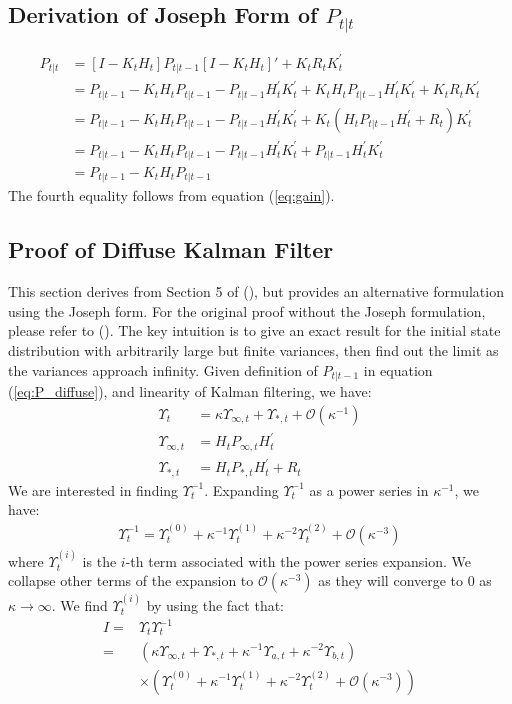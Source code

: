 \documentclass[10pt, titlepage]{article}
\numberwithin{equation}{section}
\begin{document}
\subsection{Derivation of Joseph Form of \texorpdfstring{$P_{t|t}$}{}} \label{ap:joseph}
\begin{align*}
    P_{t|t} &= [I - K_tH_t]P_{t|t-1}[I - K_tH_t]' + K_tR_tK_t^{'} \\
    &= P_{t|t-1} - K_tH_tP_{t|t-1} - P_{t|t-1}H_t^{'}K_t^{'} + K_tH_tP_{t|t-1}H_t^{'}K_t^{'} + K_tR_tK_t^{'} \\
    &= P_{t|t-1} - K_tH_tP_{t|t-1} - P_{t|t-1}H_t^{'}K_t^{'} + K_t(H_tP_{t|t-1}H_t^{'} + R_t)K_t^{'} \\
    &= P_{t|t-1} - K_tH_tP_{t|t-1} - P_{t|t-1}H_t^{'}K_t^{'} + P_{t|t-1}H_t^{'}K_t^{'} \\
    &= P_{t|t-1} - K_tH_tP_{t|t-1}
\end{align*}
The fourth equality follows from equation (\ref{eq:gain}).

\subsection{Proof of Diffuse Kalman Filter} \label{ap:init_filter}
This section derives from Section 5 of (\cite{durbin_koopman_2001}), but provides an alternative formulation using the Joseph form. For the original proof without the Joseph formulation, please refer to (\cite{durbin_koopman_2001}). The key intuition is to give an exact result for the initial state distribution with arbitrarily large but finite variances, then find out the limit as the variances approach infinity. Given definition of $P_{t|t-1}$ in equation (\ref{eq:P_diffuse}), and linearity of Kalman filtering, we have:
\begin{align*}
    \Upsilon_t &= \kappa \Upsilon_{\infty,t} + \Upsilon_{*,t} + \mathcal{O}(\kappa^{-1}) \\
    \Upsilon_{\infty,t} &= H_tP_{\infty,t}H_t^{'} \\ 
    \Upsilon_{*,t} &= H_tP_{*,t}H_t^{'} + R_t
\end{align*}
We are interested in finding $\Upsilon_t^{-1}$. Expanding $\Upsilon_t^{-1}$ as a power series in $\kappa^{-1}$, we have:
\begin{align*}
    \Upsilon_t^{-1} = \Upsilon_t^{(0)} + \kappa^{-1}\Upsilon_t^{(1)} + \kappa^{-2}\Upsilon_t^{(2)}+\mathcal{O}(\kappa^{-3})
\end{align*}
where $\Upsilon_t^{(i)}$ is the $i$-th term associated with the power series expansion. We collapse other terms of the expansion to $\mathcal{O}(\kappa^{-3})$ as they will converge to 0 as $\kappa \rightarrow \infty$. We find $\Upsilon_t^{(i)}$ by using the fact that: 
\begin{align}
    I =& \Upsilon_t\Upsilon_t^{-1} \nonumber \\
    =& (\kappa \Upsilon_{\infty,t} + \Upsilon_{*,t} + \kappa^{-1}\Upsilon_{a,t} + \kappa^{-2}\Upsilon_{b,t}) \label{eq:inverse_diff}
 \\
    &\times (\Upsilon_t^{(0)} + \kappa^{-1}\Upsilon_t^{(1)} + \kappa^{-2}\Upsilon_t^{(2)}+\mathcal{O}(\kappa^{-3})) \nonumber
\end{align}
\end{document}
